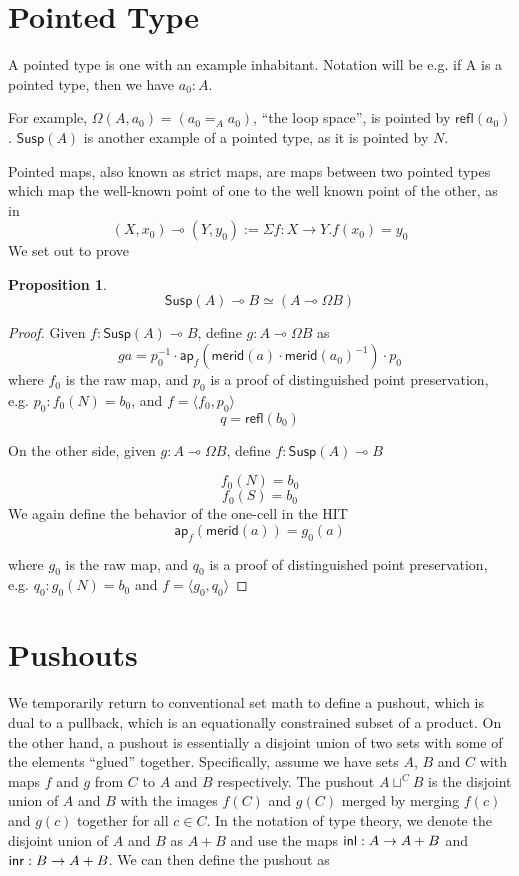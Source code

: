 \documentclass[11pt]{article}
\renewcommand{\refl}{\mathsf{refl}}
\newcommand{\lolli}{\multimap}
\newcommand*{\ap}{\mathsf{ap}}
\newcommand{\merid}{\mathsf{merid}}
\newcommand{\susp}[1]{\mathsf{Susp}(#1)}
\newtheorem{proposition}{Proposition}
\begin{document}
\section{Pointed Type}
A pointed type is one with an example inhabitant. Notation will be e.g. if A is a pointed type, then we have $a_0 : A$.

For example, $\Omega(A, a_0) = (a_0 =_A a_0)$, ``the loop space'', is pointed by $\refl(a_0)$. $\susp{A}$ is another example of a pointed type, as it is pointed by $N$.

Pointed maps, also known as strict maps, are maps between two pointed types which map the well-known point of one to the well known point of the other, as in
$$(X, x_0) \lolli (Y, y_0) := \Sigma f : X \to Y . f(x_0) = y_0$$
We set out to prove
\begin{proposition}
$$\susp{A} \lolli B \simeq (A \lolli \Omega B)$$
\end{proposition}
\begin{proof}
Given $f : \susp{A} \lolli B$, define $g : A \lolli \Omega B$ as
$$g a = p_0^{-1} \cdot \ap_f(\merid(a) \cdot \merid(a_0)^{-1}) \cdot p_0$$
where $f_0$ is the raw map, and $p_0$ is a proof of distinguished point preservation, e.g. $p_0 : f_0(N) = b_0$, and $f = \langle f_0, p_0\rangle$
$$q = \refl(b_0)$$

On the other side, given $g : A \lolli \Omega B$, define $f : \susp{A} \lolli B$

$$f_0(N) = b_0$$
$$f_0(S) = b_0$$
We again define the behavior of the one-cell in the HIT
$$\ap_f(\merid(a)) = g_0(a)$$

where $g_0$ is the raw map, and $q_0$ is a proof of distinguished point preservation, e.g. $q_0 : g_0(N) = b_0$ and $f = \langle g_0, q_0\rangle$
\end{proof}

\section{Pushouts}
We temporarily return to conventional set math to define a pushout, which is
dual to a pullback, which is an equationally constrained subset of a product.
On the other hand, a pushout is essentially a disjoint union of two sets 
with some of the elements ``glued'' together. Specifically, assume we have
sets $A$, $B$ and $C$ with maps $f$ and $g$ from $C$ to $A$ and $B$ 
respectively. The pushout 
$A \sqcup^C B$ is the disjoint union of $A$ and $B$ with the images $f(C)$ and
$g(C)$ merged by merging $f(c)$ and $g(c)$ together for all $c \in C$. In the
notation of type theory, we denote the disjoint union of $A$ and $B$ as 
$A + B$ and use the maps ${\mathsf{inl}}: A \to A + B$ and ${\mathsf{inr}}: B \to A + B$. We
can then define the pushout as
\end{document}
